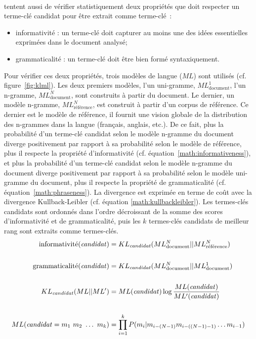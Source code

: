         ~\\ tentent aussi de vérifier
        statistiquement deux propriétés que doit respecter un terme-clé candidat
        pour être extrait comme terme-clé~:
        \begin{itemize}
          \item{informativité : un terme-clé doit capturer au moins une des
                idées essentielles exprimées dans le document analysé;}
          \item{grammaticalité : un terme-clé doit être bien formé
                syntaxiquement.}
        \end{itemize}
        Pour vérifier ces deux propriétés, trois modèles de langue ($ML$) sont
        utilisés (cf. figure~\ref{fig:klml}). Les deux premiers modèles, l'un
        uni-gramme, $ML_{\text{document}}^1$, l'un n-gramme,
        $ML_{\text{document}}^N$, sont construits à partir du document. Le
        dernier, un modèle n-gramme, $ML_{\text{référence}}^N$, est construit à
        partir d'un corpus de référence. Ce dernier est le modèle de référence,
        il fournit une vision globale de la distribution des n-grammes dans la
        langue (français, anglais, etc.). De ce fait, plus la probabilité d'un
        terme-clé candidat selon le modèle n-gramme du document diverge
        positivement par rapport à sa probabilité selon le modèle de référence,
        plus il respecte la propriété d'informativité (cf.
        équation~\ref{math:informativeness}), et plus la probabilité d'un
        terme-clé candidat selon le modèle n-gramme du document diverge
        positivement par rapport à sa probabilité selon le modèle uni-gramme du
        document, plus il respecte la propriété de grammaticalité (cf.
        équation~\ref{math:phraseness}). La divergence est exprimée en terme de
        coût avec la divergence Kullback-Leibler (cf. équation
        \ref{math:kullbackleibler}). Les termes-clés candidats sont ordonnés
        dans l'ordre décroissant de la somme des scores d'informativité et de
        grammaticalité, puis les $k$ termes-clés candidats de meilleur rang sont
        extraits comme termes-clés.
        \begin{align}
          \text{informativité}(\text{\textit{candidat}}) &= KL_{\text{\textit{candidat}}}(ML_{\text{document}}^{N} || ML_{\text{référence}}^{N}) \label{math:informativeness}\\
          \notag\\
          \text{grammaticalité}(\text{\textit{candidat}}) &= KL_{\text{\textit{candidat}}}(ML_{\text{document}}^{N} || ML_{\text{document}}^{1}) \label{math:phraseness}\\
          \notag\\
          KL_{\text{\textit{candidat}}}(ML || ML') &= ML(\text{\textit{candidat}}) \log \frac{ML(\text{\textit{candidat}})}{ML'(\text{\textit{candidat}})} \label{math:kullbackleibler}\\
          \notag\\
          ML(\text{\textit{candidat}} = m_1\ m_2\ \dots\ m_k) &= \prod_{i = 1}^k P(m_i | m_{i - (N - 1)} m_{i - ((N - 1) - 1)} \dots m_{i - 1}) \notag
        \end{align}
